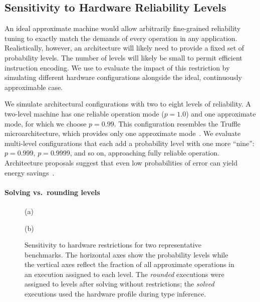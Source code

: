 \subsection{Sensitivity to Hardware Reliability Levels}

An ideal approximate machine would allow arbitrarily fine-grained reliability
tuning to exactly match the demands of every operation in any application.
Realistically, however, an architecture will likely need to provide a fixed set of
probability levels.
The number of levels will likely be small to permit efficient instruction
encoding.
We use \lang to evaluate the impact of this restriction by simulating
different hardware configurations alongside the ideal, continuously
approximable case.

We simulate architectural configurations with two to eight levels of
reliability.
A two-level machine has one reliable operation mode ($p = 1.0$) and one
approximate mode, for which we choose $p = 0.99$.
This configuration resembles the Truffle microarchitecture, which provides
only one approximate mode~\cite{truffle}.
We evaluate multi-level configurations that each add a probability level with
one more ``nine'': $p = 0.999$, $p=0.9999$, and so on, approaching fully
reliable operation.
Architecture proposals suggest that even low probabilities of error can
yield energy savings~\cite{hizli, kumarhpca, palem-adders}.

\paragraph{Solving vs.~rounding levels}

\begin{figure}
    \centering

        
        \vspace{-5ex}

        (a) 
        \vspace{2ex}

        
        \vspace{-5ex}

        (b) 

    \caption{Sensitivity to hardware restrictions for two representative benchmarks. The
    horizontal axes show the probability levels while the vertical axes
    reflect the fraction of all approximate operations in an execution
    assigned to each level. The \emph{rounded} executions were assigned to levels
    after solving without restrictions; the \emph{solved} executions used the
    hardware profile during type inference.}
    \label{decaf:fig:spark}
\end{figure}

